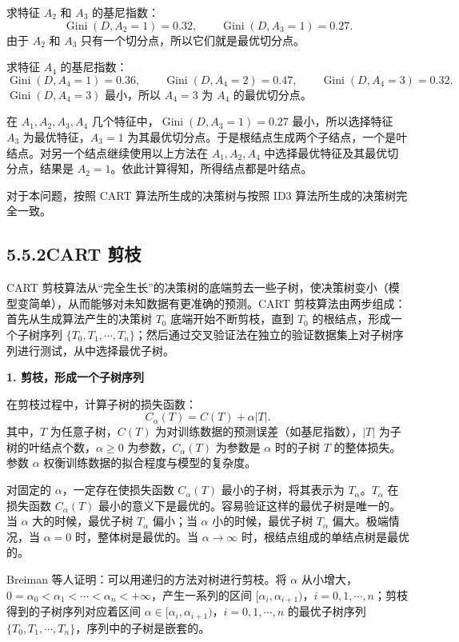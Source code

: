 \documentclass[UTF8, 12pt, fontset=fandol, oneside]{ctexart}
\begin{document}
求特征 $A_2$ 和 $A_3$ 的基尼指数：
\[
  \operatorname{Gini}(D,A_2=1)=0.32,\qquad
  \operatorname{Gini}(D,A_3=1)=0.27.
\]
由于 $A_2$ 和 $A_3$ 只有一个切分点，所以它们就是最优切分点。

求特征 $A_4$ 的基尼指数：
\[
  \operatorname{Gini}(D,A_4=1)=0.36,\qquad
  \operatorname{Gini}(D,A_4=2)=0.47,\qquad
  \operatorname{Gini}(D,A_4=3)=0.32.
\]
$\operatorname{Gini}(D,A_4=3)$ 最小，所以 $A_4=3$ 为 $A_4$ 的最优切分点。

在 $A_1,A_2,A_3,A_4$ 几个特征中，$\operatorname{Gini}(D,A_3=1)=0.27$ 最小，所以选择特征 $A_3$ 为最优特征，$A_3=1$ 为其最优切分点。于是根结点生成两个子结点，一个是叶结点。对另一个结点继续使用以上方法在 $A_1,A_2,A_4$ 中选择最优特征及其最优切分点，结果是 $A_2=1$。依此计算得知，所得结点都是叶结点。

对于本问题，按照 CART 算法所生成的决策树与按照 ID3 算法所生成的决策树完全一致。

\subsection*{5.5.2\quad CART 剪枝}

CART 剪枝算法从“完全生长”的决策树的底端剪去一些子树，使决策树变小（模型变简单），从而能够对未知数据有更准确的预测。CART 剪枝算法由两步组成：首先从生成算法产生的决策树 $T_0$ 底端开始不断剪枝，直到 $T_0$ 的根结点，形成一个子树序列 $\{T_0,T_1,\cdots,T_n\}$；然后通过交叉验证法在独立的验证数据集上对子树序列进行测试，从中选择最优子树。

\noindent\textbf{1. 剪枝，形成一个子树序列}

在剪枝过程中，计算子树的损失函数：
\begin{equation}
  C_\alpha(T)=C(T)+\alpha|T|.
  \tag{5.26}
\end{equation}
其中，$T$ 为任意子树，$C(T)$ 为对训练数据的预测误差（如基尼指数），$|T|$ 为子树的叶结点个数，$\alpha\ge0$ 为参数，$C_\alpha(T)$ 为参数是 $\alpha$ 时的子树 $T$ 的整体损失。参数 $\alpha$ 权衡训练数据的拟合程度与模型的复杂度。

对固定的 $\alpha$，一定存在使损失函数 $C_\alpha(T)$ 最小的子树，将其表示为 $T_\alpha$。$T_\alpha$ 在损失函数 $C_\alpha(T)$ 最小的意义下是最优的。容易验证这样的最优子树是唯一的。当 $\alpha$ 大的时候，最优子树 $T_\alpha$ 偏小；当 $\alpha$ 小的时候，最优子树 $T_\alpha$ 偏大。极端情况，当 $\alpha=0$ 时，整体树是最优的。当 $\alpha\to\infty$ 时，根结点组成的单结点树是最优的。

Breiman 等人证明：可以用递归的方法对树进行剪枝。将 $\alpha$ 从小增大，$0=\alpha_0<\alpha_1<\cdots<\alpha_n<+\infty$，产生一系列的区间 $[\alpha_i,\alpha_{i+1})$，$i=0,1,\cdots,n$；剪枝得到的子树序列对应着区间 $\alpha\in[\alpha_i,\alpha_{i+1})$，$i=0,1,\cdots,n$ 的最优子树序列 $\{T_0,T_1,\cdots,T_n\}$，序列中的子树是嵌套的。
\end{document}
